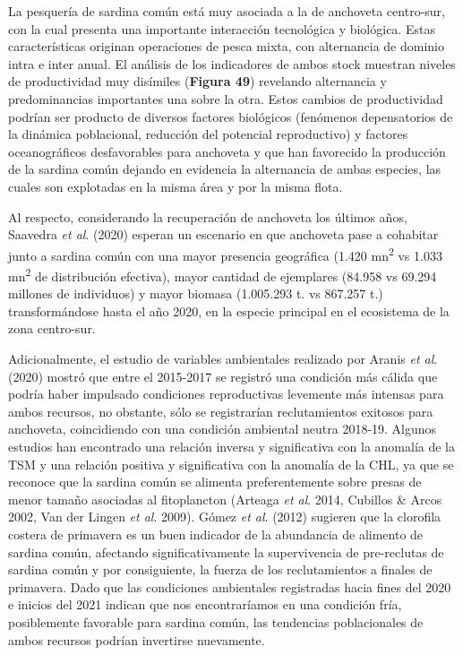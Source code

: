 \documentclass[
  spanish,
]{article}
\begin{document}
La pesquería de sardina común está muy asociada a la de anchoveta
centro-sur, con la cual presenta una importante interacción tecnológica
y biológica. Estas características originan operaciones de pesca mixta,
con alternancia de dominio intra e inter anual. El análisis de los
indicadores de ambos stock muestran niveles de productividad muy
disímiles (\textbf{Figura 49}) revelando alternancia y predominancias
importantes una sobre la otra. Estos cambios de productividad podrían
ser producto de diversos factores biológicos (fenómenos depensatorios de
la dinámica poblacional, reducción del potencial reproductivo) y
factores oceanográficos desfavorables para anchoveta y que han
favorecido la producción de la sardina común dejando en evidencia la
alternancia de ambas especies, las cuales son explotadas en la misma
área y por la misma flota.

Al respecto, considerando la recuperación de anchoveta los últimos años,
Saavedra \emph{et al}. (2020) esperan un escenario en que anchoveta pase
a cohabitar junto a sardina común con una mayor presencia geográfica
(1.420 mn\textsuperscript{2} vs 1.033 mn\textsuperscript{2} de
distribución efectiva), mayor cantidad de ejemplares (84.958 vs 69.294
millones de individuos) y mayor biomasa (1.005.293 t. vs 867.257 t.)
transformándose hasta el año 2020, en la especie principal en el
ecosistema de la zona centro-sur.

Adicionalmente, el estudio de variables ambientales realizado por Aranis
\emph{et al}. (2020) mostró que entre el 2015-2017 se registró una
condición más cálida que podría haber impulsado condiciones
reproductivas levemente más intensas para ambos recursos, no obstante,
sólo se registrarían reclutamientos exitosos para anchoveta,
coincidiendo con una condición ambiental neutra 2018-19. Algunos
estudios han encontrado una relación inversa y significativa con la
anomalía de la TSM y una relación positiva y significativa con la
anomalía de la CHL, ya que se reconoce que la sardina común se alimenta
preferentemente sobre presas de menor tamaño asociadas al fitoplancton
(Arteaga \emph{et al}. 2014, Cubillos \& Arcos 2002, Van der Lingen
\emph{et al}. 2009). Gómez \emph{et al}. (2012) sugieren que la
clorofila costera de primavera es un buen indicador de la abundancia de
alimento de sardina común, afectando significativamente la supervivencia
de pre-reclutas de sardina común y por consiguiente, la fuerza de los
reclutamientos a finales de primavera. Dado que las condiciones
ambientales registradas hacia fines del 2020 e inicios del 2021 indican
que nos encontraríamos en una condición fría, posiblemente favorable
para sardina común, las tendencias poblacionales de ambos recursos
podrían invertirse nuevamente.
\end{document}

